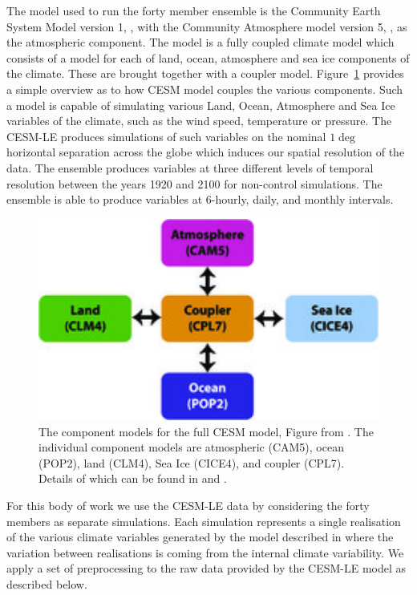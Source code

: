  The model used to run the forty member ensemble is the Community Earth System Model version 1, \citep{hurrell_community_2013}, with the Community Atmosphere model version 5, \citep{hurrell_community_2013}, as the atmospheric component.
 The model is a fully coupled climate model which consists of a model for each of land, ocean, atmosphere and sea ice components of the climate.
 These are brought together with a coupler model.
 Figure~\ref{fig:cesm} provides a simple overview as to how CESM model couples the various components.
 Such a model is capable of simulating various Land, Ocean, Atmosphere and Sea Ice variables of the climate, such as the wind speed, temperature or pressure.
 The CESM-LE produces simulations of such variables on the nominal $1\deg$ horizontal separation across the globe which induces our spatial resolution of the data.
 The ensemble produces variables at three different levels of temporal resolution between the years 1920 and 2100 for non-control simulations. The ensemble is able to produce variables at 6-hourly, daily, and monthly intervals. 
 
 \begin{figure}[htbp!] 
 	\centering    
 	\includegraphics[width=1.0\textwidth]{cesm_components}
 	\caption[CESM component models]{The component models for the full CESM model, Figure from \citep{kay_community_2015}. The individual component models are atmospheric (CAM5), ocean (POP2), land (CLM4), Sea Ice (CICE4), and coupler (CPL7). Details of which can be found in \citep{kay_community_2015} and \citep{hurrell_community_2013}.}
 	\label{fig:cesm}
 \end{figure}

 For this body of work we use the CESM-LE data by considering the forty members as separate simulations.
 Each simulation represents a single realisation of the various climate variables generated by the model described in \citep{kay_community_2015} where the variation between realisations is coming from the internal climate variability. 
 We apply a set of preprocessing to the raw data provided by the CESM-LE model as described below. 
 
